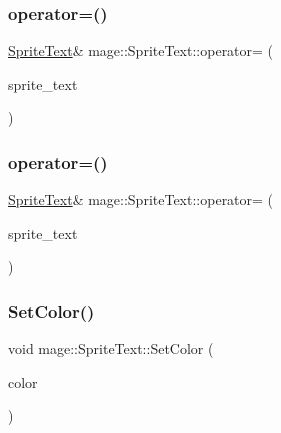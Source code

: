 \hypertarget{classmage_1_1_sprite_text_ad9bdf1d36eab783d2f742f32c464aa0b}{}\label{classmage_1_1_sprite_text_ad9bdf1d36eab783d2f742f32c464aa0b} 
\subsubsection{\texorpdfstring{operator=()}{operator=()}\hspace{0.1cm}{\footnotesize\ttfamily [1/2]}}
{\footnotesize\ttfamily \hyperlink{classmage_1_1_sprite_text}{Sprite\+Text}\& mage\+::\+Sprite\+Text\+::operator= (\begin{DoxyParamCaption}\item[{const \hyperlink{classmage_1_1_sprite_text}{Sprite\+Text} \&}]{sprite\+\_\+text }\end{DoxyParamCaption})\hspace{0.3cm}{\ttfamily [default]}}

\hypertarget{classmage_1_1_sprite_text_a48e9d2fdda8bf2f8847a425444df980c}{}\label{classmage_1_1_sprite_text_a48e9d2fdda8bf2f8847a425444df980c} 
\subsubsection{\texorpdfstring{operator=()}{operator=()}\hspace{0.1cm}{\footnotesize\ttfamily [2/2]}}
{\footnotesize\ttfamily \hyperlink{classmage_1_1_sprite_text}{Sprite\+Text}\& mage\+::\+Sprite\+Text\+::operator= (\begin{DoxyParamCaption}\item[{\hyperlink{classmage_1_1_sprite_text}{Sprite\+Text} \&\&}]{sprite\+\_\+text }\end{DoxyParamCaption})\hspace{0.3cm}{\ttfamily [default]}}

\hypertarget{classmage_1_1_sprite_text_acaeb6686d0a5d89d799dd3ac4390a242}{}\label{classmage_1_1_sprite_text_acaeb6686d0a5d89d799dd3ac4390a242} 
\subsubsection{\texorpdfstring{Set\+Color()}{SetColor()}\hspace{0.1cm}{\footnotesize\ttfamily [1/2]}}
{\footnotesize\ttfamily void mage\+::\+Sprite\+Text\+::\+Set\+Color (\begin{DoxyParamCaption}\item[{const \hyperlink{structmage_1_1_color}{Color} \&}]{color }\end{DoxyParamCaption})}

